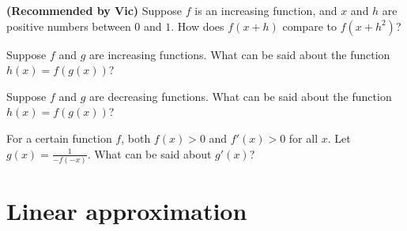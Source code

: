 \documentclass{ximera}
\newcommand{\recommendation}[1]{\textbf{(Recommended by #1)}}
\begin{document}
\begin{problem}
\recommendation{Vic}
  Suppose $f$ is an increasing function, and $x$ and $h$ are positive numbers between $0$ and $1$.  How does $f(x + h)$ compare to $f(x + h^2)$?
  \begin{multipleChoice}
  \end{multipleChoice}
\end{problem}

\begin{problem}
  Suppose $f$ and $g$ are increasing functions.  What can be said about the function $h(x) = f(g(x))$?
  \begin{multipleChoice}
  \end{multipleChoice}
\end{problem}

\begin{problem}
  Suppose $f$ and $g$ are decreasing functions.  What can be said about the function $h(x) = f(g(x))$?
  \begin{multipleChoice}
  \end{multipleChoice}
\end{problem}

\begin{problem}
  For a certain function $f$, both $f(x) > 0$ and $f'(x) > 0$ for all $x$.  Let $g(x) = \frac{1}{-f(-x)}$.  What can be said about $g'(x)$?
  \begin{multipleChoice}
  \end{multipleChoice}
\end{problem}

\clearpage

\section{Linear approximation}
\end{document}
